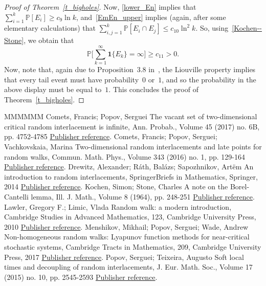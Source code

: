 \documentclass[11pt]{article}
\theoremstyle{definition}
\numberwithin{equation}{section}
\numberwithin{figure}{section}
\numberwithin{table}{section}
\newcommand{\1}[1]{{\mathbf 1}{\{#1\}}}
\newcommand{\8}{{\infty}}
\newcommand{\IP}{{\mathbb P}}
\begin{document}
\begin{proof}[Proof of Theorem~\ref{t_bigholes}]
Now, \eqref{lower_En} implies that $\sum_{i=1}^k\IP[E_i]\geq c_{9}\ln k$, and~\eqref{EmEn_upper} implies (again, after some elementary calculations) that $\sum_{i,j=1}^k\IP[E_i\cap E_j]\leq c_{10}\ln^2 k$. So, using~\eqref{Kochen--Stone}, we obtain that
\[
\IP\Big[\sum_{k=1}^\infty \1{E_k}=\infty\Big] \geq c_{11}>0.
\]
Now, note that, again due to Proposition~3.8 in~\cite[Chapter~2]{R84}, the Liouville property implies that every tail event must have probability~$0$ or~$1$, and so the probability in the above display must be equal to~$1$. This concludes the proof of Theorem~\ref{t_bigholes}.
\end{proof}

\begin{thebibliography}{MMMMMM}
 Comets, Francis; Popov, Serguei The vacant set of two-dimensional critical random interlacement is infinite, Ann. Probab., Volume 45 (2017) no. 6B, pp. 4752-4785 \href{https://ahl.centre-mersenne.org/item/AHL_2019__2__349_0/#CP16}{Publisher reference}.
 Comets, Francis; Popov, Serguei; Vachkovskaia, Marina Two-dimensional random interlacements and late points for random walks, Commun. Math. Phys., Volume 343 (2016) no. 1, pp. 129-164 \href{https://ahl.centre-mersenne.org/item/AHL_2019__2__349_0/#CPV16}{Publisher reference}.
 Drewitz, Alexander; Ráth, Balázs; Sapozhnikov, Artëm An introduction to random interlacements, SpringerBriefs in Mathematics, Springer, 2014 \href{https://ahl.centre-mersenne.org/item/AHL_2019__2__349_0/#DRS14}{Publisher reference}.
 Kochen, Simon; Stone, Charles A note on the Borel-Cantelli lemma, Ill. J. Math., Volume 8 (1964), pp. 248-251 \href{https://ahl.centre-mersenne.org/item/AHL_2019__2__349_0/#KS64}{Publisher reference}.
 Lawler, Gregory F.; Limic, Vlada Random walk: a modern introduction, Cambridge Studies in Advanced Mathematics, 123, Cambridge University Press, 2010 \href{https://ahl.centre-mersenne.org/item/AHL_2019__2__349_0/#LL10}{Publisher reference}.
 Menshikov, Mikhail; Popov, Serguei; Wade, Andrew Non-homogeneous random walks: Lyapunov function methods for near-critical stochastic systems, Cambridge Tracts in Mathematics, 209, Cambridge University Press, 2017 \href{https://ahl.centre-mersenne.org/item/AHL_2019__2__349_0/#MPW17}{Publisher reference}.
 Popov, Serguei; Teixeira, Augusto Soft local times and decoupling of random interlacements, J. Eur. Math. Soc., Volume 17 (2015) no. 10, pp. 2545-2593 \href{https://ahl.centre-mersenne.org/item/AHL_2019__2__349_0/#SLT}{Publisher reference}.

\end{thebibliography}
\end{document}
